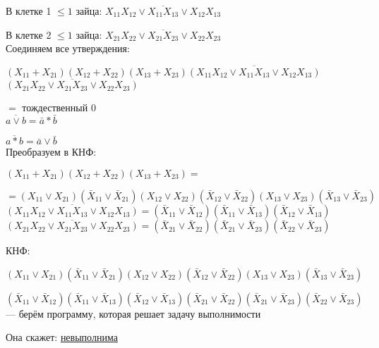 \documentclass[a4paper, 12pt] {article}
\begin{document}
В клетке 1 $ \le 1 $ зайца: $ \overline{X_{1 1}X_{1 2} \vee X_{1 1}X_{1 3} \vee X_{1 2}X_{1 3}}$

В клетке 2 $ \le 1 $ зайца: $ \overline{X_{2 1}X_{2 2} \vee X_{2 1}X_{2 3} \vee X_{2 2}X_{2 3}}$\\

Соединяем все утверждения:

$ (X_{11} + X_{21})(X_{12} + X_{22})(X_{13} + X_{23}) \overline{(X_{1 1}X_{1 2} \vee X_{1 1}X_{1 3} \vee X_{1 2}X_{1 3})} $  $ \overline{(X_{2 1}X_{2 2} \vee X_{2 1}X_{2 3} \vee X_{2 2}X_{2 3})} $

$ = $ тождественный 0\\

$ \overline{a \vee b} = \bar a * \bar b$

$ \overline{a * b} = \bar a \vee \bar b$\\

Преобразуем в КНФ:

$ (X_{11} + X_{21})(X_{12} + X_{22})(X_{13} + X_{23}) =$ 

$= (X_{11} \vee X_{21})(\bar X_{11} \vee \bar X_{21}) (X_{12} \vee X_{22})(\bar X_{12} \vee \bar X_{22}) (X_{13} \vee X_{23})(\bar X_{13} \vee \bar X_{23}) $\\
 
$ \overline{(X_{1 1}X_{1 2} \vee X_{1 1}X_{1 3} \vee X_{1 2}X_{1 3})} = 
(\bar X_{1 1} \vee \bar X_{1 2})(\bar X_{1 1} \vee \bar X_{1 3})(\bar X_{1 2} \vee \bar X_{1 3}) $\\

$ \overline{(X_{2 1}X_{2 2} \vee X_{2 1}X_{2 3} \vee X_{2 2}X_{2 3})} = 
 (\bar X_{2 1} \vee \bar X_{2 2})(\bar X_{2 1} \vee \bar X_{2 3})(\bar X_{2 2} \vee \bar X_{2 3})$
 
 \newpage
 
 КНФ: 
 
 $ (X_{11} \vee X_{21})(\bar X_{11} \vee \bar X_{21}) (X_{12} \vee X_{22})(\bar X_{12} \vee \bar X_{22}) (X_{13} \vee X_{23})(\bar X_{13} \vee \bar X_{23})$ 
 
 $(\bar X_{1 1} \vee \bar X_{1 2})(\bar X_{1 1} \vee \bar X_{1 3})(\bar X_{1 2} \vee \bar X_{1 3})
 (\bar X_{2 1} \vee \bar X_{2 2})(\bar X_{2 1} \vee \bar X_{2 3})(\bar X_{2 2} \vee \bar X_{2 3}) $\\
 
 --- берём программу, которая решает задачу выполнимости
 
 Она скажет: \underline{невыполнима}\\
 
\end{document}
